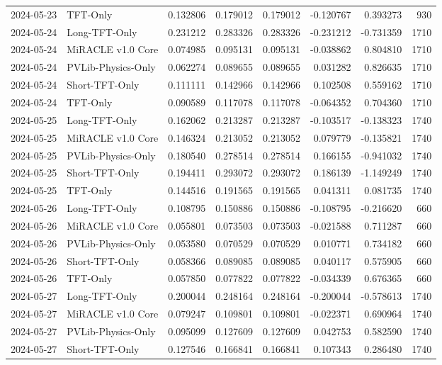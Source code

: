 \begin{tabular}{llrrrrrr}
2024-05-23 & TFT-Only & 0.132806 & 0.179012 & 0.179012 & -0.120767 & 0.393273 & 930 \\
2024-05-24 & Long-TFT-Only & 0.231212 & 0.283326 & 0.283326 & -0.231212 & -0.731359 & 1710 \\
2024-05-24 & MiRACLE v1.0 Core & 0.074985 & 0.095131 & 0.095131 & -0.038862 & 0.804810 & 1710 \\
2024-05-24 & PVLib-Physics-Only & 0.062274 & 0.089655 & 0.089655 & 0.031282 & 0.826635 & 1710 \\
2024-05-24 & Short-TFT-Only & 0.111111 & 0.142966 & 0.142966 & 0.102508 & 0.559162 & 1710 \\
2024-05-24 & TFT-Only & 0.090589 & 0.117078 & 0.117078 & -0.064352 & 0.704360 & 1710 \\
2024-05-25 & Long-TFT-Only & 0.162062 & 0.213287 & 0.213287 & -0.103517 & -0.138323 & 1740 \\
2024-05-25 & MiRACLE v1.0 Core & 0.146324 & 0.213052 & 0.213052 & 0.079779 & -0.135821 & 1740 \\
2024-05-25 & PVLib-Physics-Only & 0.180540 & 0.278514 & 0.278514 & 0.166155 & -0.941032 & 1740 \\
2024-05-25 & Short-TFT-Only & 0.194411 & 0.293072 & 0.293072 & 0.186139 & -1.149249 & 1740 \\
2024-05-25 & TFT-Only & 0.144516 & 0.191565 & 0.191565 & 0.041311 & 0.081735 & 1740 \\
2024-05-26 & Long-TFT-Only & 0.108795 & 0.150886 & 0.150886 & -0.108795 & -0.216620 & 660 \\
2024-05-26 & MiRACLE v1.0 Core & 0.055801 & 0.073503 & 0.073503 & -0.021588 & 0.711287 & 660 \\
2024-05-26 & PVLib-Physics-Only & 0.053580 & 0.070529 & 0.070529 & 0.010771 & 0.734182 & 660 \\
2024-05-26 & Short-TFT-Only & 0.058366 & 0.089085 & 0.089085 & 0.040117 & 0.575905 & 660 \\
2024-05-26 & TFT-Only & 0.057850 & 0.077822 & 0.077822 & -0.034339 & 0.676365 & 660 \\
2024-05-27 & Long-TFT-Only & 0.200044 & 0.248164 & 0.248164 & -0.200044 & -0.578613 & 1740 \\
2024-05-27 & MiRACLE v1.0 Core & 0.079247 & 0.109801 & 0.109801 & -0.022371 & 0.690964 & 1740 \\
2024-05-27 & PVLib-Physics-Only & 0.095099 & 0.127609 & 0.127609 & 0.042753 & 0.582590 & 1740 \\
2024-05-27 & Short-TFT-Only & 0.127546 & 0.166841 & 0.166841 & 0.107343 & 0.286480 & 1740 \\

\end{tabular}
